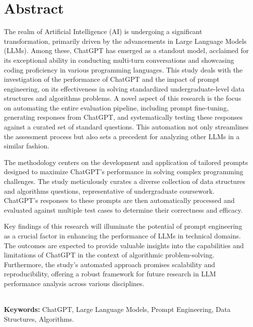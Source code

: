 \chapter*{\center \Large  Abstract}

The realm of Artificial Intelligence (AI) is undergoing a significant transformation, primarily 
driven by the advancements in Large Language Models (LLMs). Among these, ChatGPT has emerged as 
a standout model, acclaimed for its exceptional ability in conducting multi-turn conversations 
and showcasing coding proficiency in various programming languages. This study deals with the 
investigation of the performance of ChatGPT and the impact of prompt engineering, on its 
effectiveness in solving standardized undergraduate-level data structures and algorithms 
problems. A novel aspect of this research is the focus on automating the entire evaluation 
pipeline, including prompt fine-tuning, generating responses from ChatGPT, and systematically 
testing these responses against a curated set of standard questions. This automation not only 
streamlines the assessment process but also sets a precedent for analyzing other LLMs in a 
similar fashion.

The methodology centers on the development and application of tailored prompts designed to 
maximize ChatGPT's performance in solving complex programming challenges. The study 
meticulously curates a diverse collection of data structures and algorithms questions, 
representative of undergraduate coursework. ChatGPT's responses to these prompts are then 
automatically processed and evaluated against multiple test cases to determine their 
correctness and efficacy.

Key findings of this research will illuminate the potential of prompt engineering as a crucial 
factor in enhancing the performance of LLMs in technical domains. The outcomes are expected to 
provide valuable insights into the capabilities and limitations of ChatGPT in the context of 
algorithmic problem-solving. Furthermore, the study's automated approach promises scalability 
and reproducibility, offering a robust framework for future research in LLM performance 
analysis across various disciplines.


~\\[1cm]
\noindent %
\textbf{Keywords:} ChatGPT, Large Language Models, Prompt Engineering, Data Structures, Algorithms.

\vfill
\noindent

